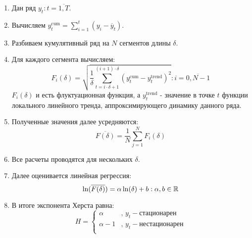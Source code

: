 \begin{enumerate}
	\item Дан ряд $y_t: t = \overline{1, T}$.
	\item Вычисляем $y^{\text{cum}}_t = \sum_{i = 1}^t (y_i - \overline{y}_t)$.
	\item Разбиваем кумулятивный ряд на $N$ сегментов длины $\delta$.
	\item Для каждого сегмента вычисляем:
	\begin{equation}
		F_i(\delta) = \sqrt{\frac{1}{\delta} \sum_{t = i \cdot \delta + 1}^{(i + 1) \cdot \delta} \left(y_t^{\text{cum}} - y^{\text{trend}}_t \right)^2}: i = \overline{0, N - 1}
	\end{equation}
	$F_i(\delta)$ и есть флуктуационная функция, а $y^{\text{trend}}_t$ - значение в точке $t$ функции локального линейного тренда, аппроксимирующего динамику данного ряда.
	\item Полученные значения далее усредняются:
	\begin{equation}
		\overline{F(\delta)} = \frac{1}{N}\sum_{j = 1}^N F_i(\delta)
	\end{equation}
	\item Все расчеты проводятся для нескольких $\delta$.
	\item Далее оценивается линейная регрессия:
	\begin{equation}
		\ln(\overline{F(\delta)}) = \alpha \ln(\delta) + b: \alpha, b \in \mathbb{R}
	\end{equation}
	\item В итоге экспонента Херста равна:
	\begin{equation}
		H = \left\{\begin{array}{rl}
			\alpha & \text{, } y_t - \text{стационарен}\\
			\alpha - 1 & \text{, } y_t - \text{нестационарен}\\
		\end{array}\right.
	\end{equation}
\end{enumerate}

